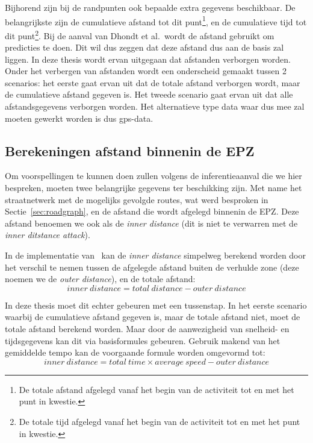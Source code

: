 Bijhorend zijn bij de randpunten ook bepaalde extra gegevens beschikbaar. De
belangrijkste zijn de cumulatieve afstand tot dit punt\footnote{De totale
    afstand afgelegd vanaf het begin van de activiteit tot en met het punt in
    kwestie.}, en de cumulatieve tijd tot dit punt\footnote{De totale tijd afgelegd
    vanaf het begin van de activiteit tot en met het punt in kwestie.}. Bij de
aanval van Dhondt et al.\ wordt de afstand gebruikt om predicties te doen. Dit
wil dus zeggen dat deze afstand dus aan de basis zal liggen. In deze thesis
wordt ervan uitgegaan dat afstanden verborgen worden. Onder het verbergen van
afstanden wordt een onderscheid gemaakt tussen 2 scenarios: het eerste gaat
ervan uit dat de totale afstand verborgen wordt, maar de cumulatieve afstand
gegeven is. Het tweede scenario gaat ervan uit dat alle afstandsgegevens
verborgen worden. Het alternatieve type data waar dus mee zal moeten gewerkt
worden is dus \ac{gps}-data.

\subsection{Berekeningen afstand binnenin de EPZ}\label{sec:berekeningen}
Om voorspellingen te kunnen doen zullen volgens de inferentieaanval die we hier
bespreken, moeten twee belangrijke gegevens ter beschikking zijn. Met name het
straatnetwerk met de mogelijks gevolgde routes, wat werd besproken in
Sectie~\ref{sec:roadgraph}, en de afstand die wordt afgelegd binnenin de
\ac{EPZ}. Deze afstand benoemen we ook als de \textit{inner distance} (dit is
niet te verwarren met de \textit{inner ditstance attack}).

In de implementatie van~\citeauthor{Dhondt} kan de \textit{inner distance}
simpelweg berekend worden door het verschil te nemen tussen de afgelegde
afstand buiten de verhulde zone (deze noemen we de \textit{outer distance}), en
de totale afstand: \[inner\ distance = total\
    distance - outer\ distance \]

In deze thesis moet dit echter gebeuren met een tussenstap. In het eerste
scenario waarbij de cumulatieve afstand gegeven is, maar de totale afstand
niet, moet de totale afstand berekend worden. Maar door de aanwezigheid van
snelheid- en tijdsgegevens kan dit via basisformules gebeuren. Gebruik makend
van het gemiddelde tempo kan de voorgaande formule worden omgevormd tot: \[inner\ distance = total\ time \times average\ speed - outer\ distance \]

